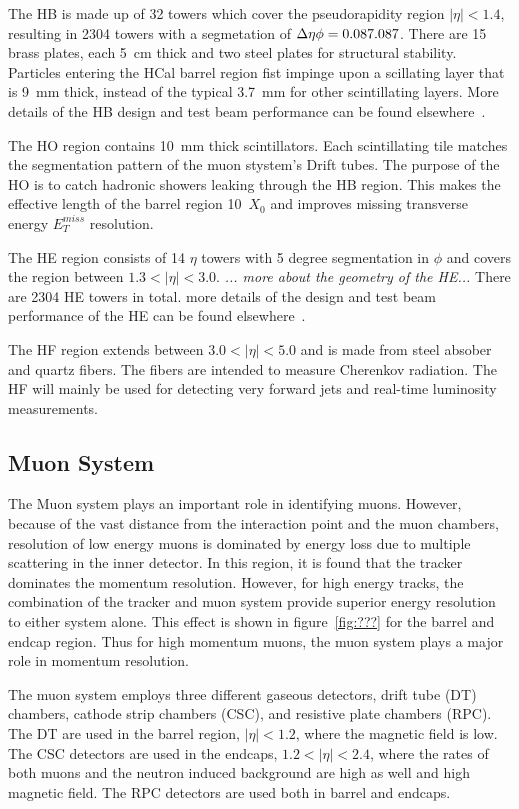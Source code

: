 The HB is made up of 32 towers which cover the pseudorapidity region 
$|\eta|<1.4$, resulting in 2304 towers with a segmetation of 
$\Delta\eta\time\Delta\phi=0.087\time0.087$.  There are 15 brass plates, 
each 5~cm thick and two steel plates for structural stability. Particles 
entering the HCal barrel region fist impinge upon a scillating layer that
is 9~mm thick, instead of the typical 3.7~mm for other scintillating layers.
More details of the HB design and test beam performance can be found
elsewhere~\cite{??}.

The HO region contains 10~mm thick scintillators.  Each scintillating tile
matches the segmentation pattern of the muon stystem's Drift tubes.  
The purpose of the HO is to catch hadronic showers leaking through the 
HB region. This makes the effective length of the barrel region 10~$X_0$
and improves missing transverse energy $E_T^{miss}$ resolution.

The HE region consists of 14 $\eta$ towers with 5 degree segmentation in 
$\phi$ and covers the region between $1.3<|\eta|<3.0$. {\it ... more about the
geometry of the HE...} There are 2304 HE towers in total.  more details of
the design and test beam performance of the HE can be found 
elsewhere~\cite{??}.

The HF region extends between $3.0<|\eta|<5.0$ and is made from steel absober
and quartz fibers.  The fibers are intended to measure Cherenkov radiation.  
The HF will mainly be used for detecting very forward jets and real-time
luminosity measurements.  

\subsection{Muon System}
\label{sec:Muon System}

The Muon system plays an important role in identifying muons.  However, 
because of the vast distance from the interaction point and the muon 
chambers, resolution of low energy muons is dominated by energy loss 
due to multiple scattering in the inner detector.  In this region, it 
is found that the tracker dominates the momentum resolution.  However, 
for high energy tracks, the combination of the tracker and muon system
provide superior energy resolution to either system alone.  This effect
is shown in figure~\ref{fig:???} for the barrel and endcap region.  Thus
for high momentum muons, the muon system plays a major role in momentum 
resolution. 

The muon system employs three different gaseous detectors, drift tube (DT)
chambers, cathode strip chambers (CSC), and resistive plate chambers (RPC).
The DT are used in the barrel region, $|\eta|<1.2$, where the magnetic 
field is low.  The CSC detectors are used in the endcaps, 
$1.2<|\eta|<2.4$, where the rates of both muons and the neutron induced
background are high as well and high magnetic field.  The RPC detectors
are used both in barrel and endcaps.  

